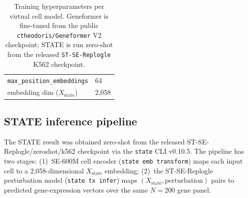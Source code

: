 \documentclass{article}
\theoremstyle{plain}
\theoremstyle{definition}
\theoremstyle{remark}
\begin{document}
\begin{table}[h]
\begin{tabular}{ll}
\hspace{1em}\texttt{max\_position\_embeddings}             & 64 \\
\hspace{1em}embedding dim ($X_{\mathrm{state}}$)           & 2{,}058 \\
\bottomrule
\end{tabular}
\caption{Training hyperparameters per virtual cell model. Geneformer is fine-tuned from the public \texttt{ctheodoris/Geneformer} V2 checkpoint; STATE is run zero-shot from the released \texttt{ST-SE-Replogle} K562 checkpoint.}
\label{tab:hparams}
\end{table}

\subsection{STATE inference pipeline}
\label{app:state_methods}

The STATE result was obtained zero-shot from the released ST-SE-Replogle/zeroshot/k562 checkpoint via the \texttt{state} CLI v0.10.5. The pipeline has two stages: (1)~SE-600M cell encoder (\texttt{state emb transform}) maps each input cell to a 2{,}058-dimensional $X_{\mathrm{state}}$ embedding; (2)~the ST-SE-Replogle perturbation model (\texttt{state tx infer}) maps $(X_{\mathrm{state}}, \mathrm{perturbation})$ pairs to predicted gene-expression vectors over the same $N{=}200$ gene panel.
\end{document}

